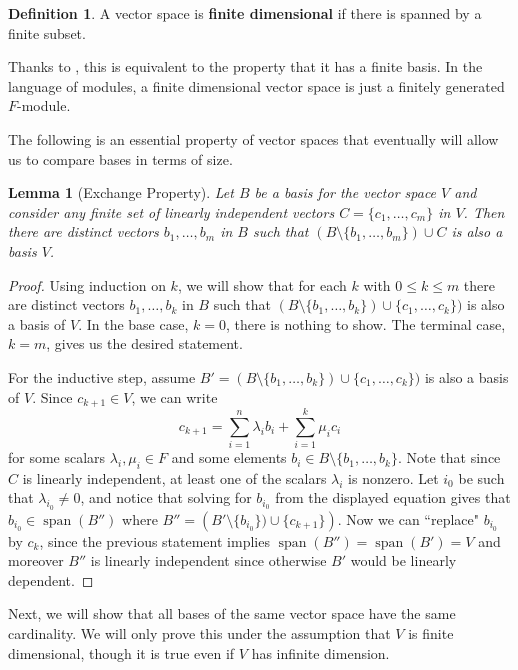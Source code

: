 \documentclass[12pt]{report}
\newtheorem{lemma}[theorem]{Lemma}
\numberwithin{equation}{section}
\numberwithin{theorem}{chapter}
\theoremstyle{definition}
\newtheorem{definition}[theorem]{Definition}
\newtheorem*{basic properties}{Basic Properties}
\newtheorem*{Important Remark}{Important Remark}
\newcommand{\df}[1]{{\bf #1}\index{#1}}
\DeclareMathOperator{\Span}{span}
\begin{document}
\begin{definition}
A vector space is \df{finite dimensional} if there is spanned by a finite subset. 
\end{definition}

Thanks to , this is equivalent to the property that it has a finite basis. In the language of modules, a finite dimensional vector space is just a finitely generated $F$-module.

The following is an essential property of vector spaces that eventually will allow us to compare bases in terms of size.

\begin{lemma}[Exchange Property]\label{lem:replacement}
 Let $B$ be a basis for the vector space $V$ and consider any finite set of linearly independent vectors $C = \{c_1, \dots, c_m\}$ in $V$. Then there are distinct vectors $b_1, \dots, b_m$ in $B$ such that $(B \setminus \{b_1, \dots, b_m\}) \cup C$ is also a basis $V$.
\end{lemma}


\begin{proof}
Using induction on $k$, we will show that for each $k$ with $0 \leqslant k \leqslant m$ there are distinct vectors $b_1, \dots, b_k$ in $B$ such that $(B \setminus \{b_1, \dots, b_k\}) \cup \{c_1, \dots, c_k\})$ is also a basis of $V$. In the base case, $k=0$, there is nothing to show. The terminal case, $k=m$, gives us the desired statement.

For the inductive step, assume $B'=(B \setminus \{b_1, \dots, b_k\}) \cup \{c_1, \dots, c_k\})$ is also a basis of $V$. Since $c_{k+1}\in V$, we can write 
\vspace{-0.5em}
$$c_{k+1}=\sum_{i=1}^n \lambda_i b_i+\sum_{i=1}^k \mu_i c_i$$
for some scalars $\lambda_i,\mu_i\in F$ and some elements $b_i\in B \setminus \{b_1, \dots, b_k\}$. Note that since $C$ is linearly independent, at least one of the scalars $\lambda_i$ is nonzero. Let $i_0$ be such that $\lambda_{i_0} \neq 0$, and notice that solving for $b_{i_0}$ from the displayed equation gives that $b_{i_0}\in \Span(B'')$ where $B''=\left(B'\setminus\{b_{i_0}\})\cup\{c_{k+1}\}\right)$. 
Now we can ``replace" $b_{i_0}$ by $c_k$, since the previous statement implies $\Span(B'')=\Span(B')=V$ and moreover $B''$ is linearly independent since otherwise $B'$ would be linearly dependent.
\end{proof}


Next, we will show that all bases of the same vector space have the same cardinality.
We will only prove this under the assumption that $V$ is finite dimensional, though it is true even if $V$ has infinite dimension.
\end{document}
